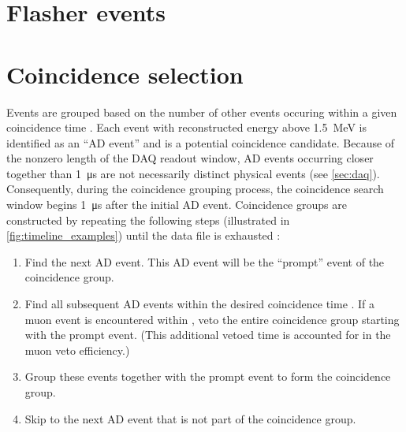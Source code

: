 
\section{Flasher events}
\label{sec:flashers}


\section{Coincidence selection}
\label{sec:coincidence}

Events are grouped based on the number of other events
occuring within a given coincidence time \tc.
Each event with reconstructed energy above \SI{1.5}{\mega\electronvolt}
is identified as an ``AD event''
and is a potential coincidence candidate.
Because of the nonzero length of the DAQ readout window,
AD events occurring closer together than \SI{1}{\micro\second}
are not necessarily distinct physical events (see \cref{sec:daq}).
Consequently, during the coincidence grouping process,
the coincidence search window begins \SI{1}{\micro\second}
after the initial AD event.
Coincidence groups are constructed by repeating the following steps
(illustrated in \cref{fig:timeline_examples}) until the data file is exhausted \cite{thucoinc2015}:

\begin{enumerate}
    \item Find the next AD event.
        This AD event will be the ``prompt'' event of the coincidence group.
    \item Find all subsequent AD events within the desired coincidence time \tc.
        If a muon event is encountered within \tc,
        veto the entire coincidence group starting with the prompt event.
        (This additional vetoed time is accounted for in the muon veto efficiency.)
    \item Group these events together with the prompt event
        to form the coincidence group.
    \item Skip to the next AD event that is not part of the coincidence group.
\end{enumerate}


